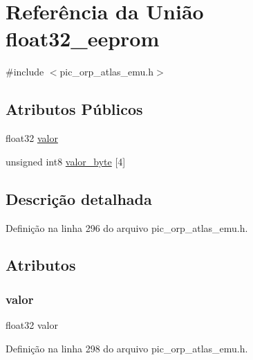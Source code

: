 \hypertarget{unionfloat32__eeprom}{}\section{Referência da União float32\+\_\+eeprom}
\label{unionfloat32__eeprom}


{\ttfamily \#include $<$pic\+\_\+orp\+\_\+atlas\+\_\+emu.\+h$>$}

\subsection*{Atributos Públicos}
\begin{DoxyCompactItemize}
\item 
float32 \mbox{\hyperlink{unionfloat32__eeprom_a54879954fcd06461d906f80110798caa}{valor}}
\item 
unsigned int8 \mbox{\hyperlink{unionfloat32__eeprom_ad19d53e50a7df8899559c159ad4f0837}{valor\+\_\+byte}} \mbox{[}4\mbox{]}
\end{DoxyCompactItemize}


\subsection{Descrição detalhada}


Definição na linha 296 do arquivo pic\+\_\+orp\+\_\+atlas\+\_\+emu.\+h.



\subsection{Atributos}
\mbox{\label{unionfloat32__eeprom_a54879954fcd06461d906f80110798caa}} 
\subsubsection{\texorpdfstring{valor}{valor}}
{\footnotesize\ttfamily float32 valor}



Definição na linha 298 do arquivo pic\+\_\+orp\+\_\+atlas\+\_\+emu.\+h.

\mbox{\label{unionfloat32__eeprom_ad19d53e50a7df8899559c159ad4f0837}} 
